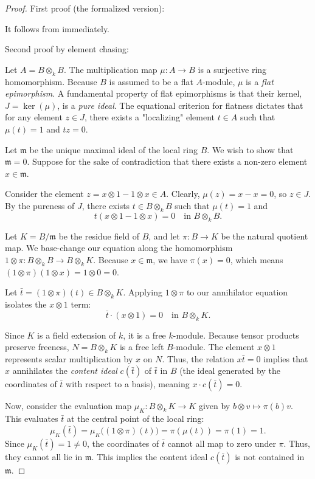 \begin{proof}
    \leanok
    First proof (the formalized version):

    It follows from  immediately.

    Second proof by element chasing:

    Let $A = B \otimes_k B$. The multiplication map $\mu: A \to B$ is a surjective ring homomorphism. Because $B$ is assumed to be a flat $A$-module, $\mu$ is a \emph{flat epimorphism}. A fundamental property of flat epimorphisms is that their kernel, $J = \ker(\mu)$, is a \emph{pure ideal}. The equational criterion for flatness dictates that for any element $z \in J$, there exists a "localizing" element $t \in A$ such that $\mu(t) = 1$ and $t z = 0$.

    Let $\mathfrak{m}$ be the unique maximal ideal of the local ring $B$. We wish to show that $\mathfrak{m} = 0$. Suppose for the sake of contradiction that there exists a non-zero element $x \in \mathfrak{m}$.

    Consider the element $z = x \otimes 1 - 1 \otimes x \in A$. Clearly, $\mu(z) = x - x = 0$, so $z \in J$. By the pureness of $J$, there exists $t \in B \otimes_k B$ such that $\mu(t) = 1$ and 
    \[
    t(x \otimes 1 - 1 \otimes x) = 0 \quad \text{in } B \otimes_k B.
    \]

    Let $K = B/\mathfrak{m}$ be the residue field of $B$, and let $\pi: B \to K$ be the natural quotient map. We base-change our equation along the homomorphism $1 \otimes \pi: B \otimes_k B \to B \otimes_k K$. Because $x \in \mathfrak{m}$, we have $\pi(x) = 0$, which means $(1 \otimes \pi)(1 \otimes x) = 1 \otimes 0 = 0$. 

    Let $\bar{t} = (1 \otimes \pi)(t) \in B \otimes_k K$. Applying $1 \otimes \pi$ to our annihilator equation isolates the $x \otimes 1$ term:
    \[
    \bar{t} \cdot (x \otimes 1) = 0 \quad \text{in } B \otimes_k K.
    \]

    Since $K$ is a field extension of $k$, it is a free $k$-module. Because tensor products preserve freeness, $N = B \otimes_k K$ is a free left $B$-module. The element $x \otimes 1$ represents scalar multiplication by $x$ on $N$. Thus, the relation $x \bar{t} = 0$ implies that $x$ annihilates the \emph{content ideal} $c(\bar{t})$ of $\bar{t}$ in $B$ (the ideal generated by the coordinates of $\bar{t}$ with respect to a basis), meaning $x \cdot c(\bar{t}) = 0$.

    Now, consider the evaluation map $\mu_K: B \otimes_k K \to K$ given by $b \otimes v \mapsto \pi(b)v$. This evaluates $\bar{t}$ at the central point of the local ring:
    \[
    \mu_K(\bar{t}) = \mu_K\big((1 \otimes \pi)(t)\big) = \pi(\mu(t)) = \pi(1) = 1.
    \]
    Since $\mu_K(\bar{t}) = 1 \neq 0$, the coordinates of $\bar{t}$ cannot all map to zero under $\pi$. Thus, they cannot all lie in $\mathfrak{m}$. This implies the content ideal $c(\bar{t})$ is not contained in $\mathfrak{m}$. 


\end{proof}
